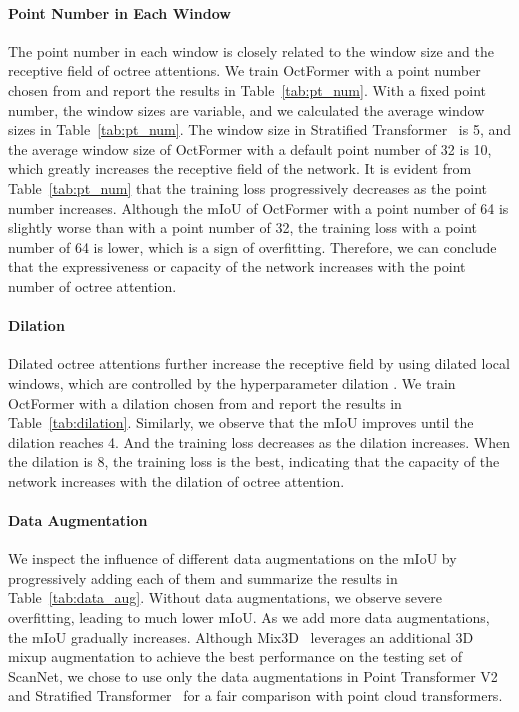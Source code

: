 \documentclass[acmtog,screen,authorversion]{acmart}
\begin{document}
\paragraph{Point Number in Each Window}
The point number  in each window is closely related to the window size and the receptive field of octree attentions.
We train OctFormer with a point number chosen from  and report the results in Table~\ref{tab:pt_num}.
With a fixed point number, the window sizes are variable, and we calculated the average window sizes in Table~\ref{tab:pt_num}.
The window size in Stratified Transformer~\cite{Lai2022} is 5, and the average window size of OctFormer with a default point number of 32 is 10, which greatly increases the receptive field of the network.
It is evident from Table~\ref{tab:pt_num} that the training loss progressively decreases as the point number increases.
Although the mIoU of OctFormer with a point number of 64 is slightly worse than with a point number of 32, the training loss with a point number of 64 is lower, which is a sign of overfitting.
Therefore, we can conclude that the expressiveness or capacity of the network increases with the point number of octree attention.



\paragraph{Dilation}
Dilated octree attentions further increase the receptive field by using dilated local windows, which are controlled by the hyperparameter dilation .
We train OctFormer with a dilation chosen from  and report the results in Table~\ref{tab:dilation}.
Similarly, we observe that the mIoU improves until the dilation reaches 4.
And the training loss decreases as the dilation increases.
When the dilation is 8, the training loss is the best, indicating that the capacity of the network increases with the dilation of octree attention.

\paragraph{Data Augmentation}
We inspect the influence of different data augmentations on the mIoU by progressively adding each of them and summarize the results in Table~\ref{tab:data_aug}.
Without data augmentations, we observe severe overfitting, leading to much lower mIoU.
As we add more data augmentations, the mIoU gradually increases.
Although Mix3D~\cite{Nekrasov2021} leverages an additional 3D mixup augmentation to achieve the best performance on the testing set of ScanNet, we chose to use only the data augmentations in Point Transformer V2~\cite{Wu2022} and Stratified Transformer~\cite{Lai2022} for a fair comparison with point cloud transformers.
\end{document}
